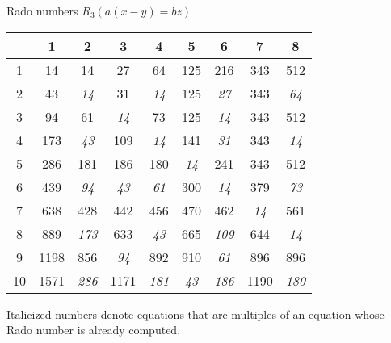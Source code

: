 \documentclass{beamer}
\begin{document}
\begin{frame}{Rado numbers $R_3(a(x-y) = bz)$}
 
\begin{center}
\begin{tabular}{c|cccccccc}
	\diagbox{$b$}{$a$} & 1 & 2 & 3 & 4 &5&6&7&8\\
	\hline
	1 & 14 & 14 & 27 & 64 &125 &216 & 343 & 512\\
	2 & 43 & \textit{14} & 31 & \textit{14} &125 &\textit{27} &343&\textit{64} \\
	3 & 94 & 61 & \textit{14} & 73 &125&\textit{14}&343&512\\
	4 & 173 & \textit{43} & 109 & \textit{14} &141&\textit{31}&343&\textit{14} \\
	5 & 286 & 181 & 186 & 180 &\textit{14} &241 & 343 & 512\\
	6 & 439 & \textit{94} & \textit{43}  & \textit{61} &300&\textit{14}& 379 &\textit{73}\\
	7 & 638 & 428 & 442 & 456 &470&462 &\textit{14}&561\\
	8 & 889 & \textit{173} & 633 & \textit{43}&665&\textit{109}& 644 &\textit{14}\\
	9 & 1198 & 856 & \textit{94}& 892 & 910 & \textit{61} & 896 & 896\\
	10 & 1571 & \textit{286} & 1171 & \textit{181} &\textit{43}& \textit{186} & 1190 &\textit{180}
\end{tabular}
\end{center}
Italicized numbers denote equations that are multiples of an equation whose Rado number is already computed.
\end{frame}
\end{document}
